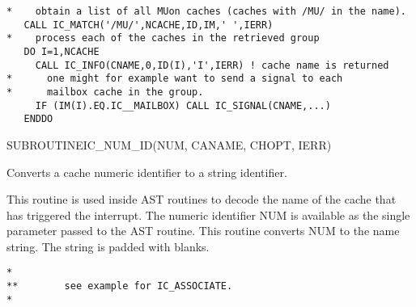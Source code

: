\begin{routine}
\begin{describe}
\end{describe}
\begin{options}
\end{options}
\begin{returncodes}
\end{returncodes}
\begin{examplecode}\begin{verbatim}
*    obtain a list of all MUon caches (caches with /MU/ in the name).
   CALL IC_MATCH('/MU/',NCACHE,ID,IM,' ',IERR)
*    process each of the caches in the retrieved group
   DO I=1,NCACHE
     CALL IC_INFO(CNAME,0,ID(I),'I',IERR) ! cache name is returned
*      one might for example want to send a signal to each
*      mailbox cache in the group.
     IF (IM(I).EQ.IC__MAILBOX) CALL IC_SIGNAL(CNAME,...)
   ENDDO
\end{verbatim}\end{examplecode}
\end{routine}


\begin{routine} %
\subroutine
   {SUBROUTINE}{IC\_NUM\_ID}{(NUM, CANAME, CHOPT, IERR)}
\begin{overview}
Converts a cache numeric identifier to a string identifier.
\end{overview}
\begin{argdeflist}
\end{argdeflist}
\begin{describe}

This routine is used inside AST routines to decode the name of the
cache that has triggered the interrupt. The numeric identifier NUM is
available as the single parameter passed to the AST routine. This
routine converts NUM to the name string. The string is padded with
blanks.

\end{describe}
\begin{options}
\end{options}
\begin{returncodes}
\end{returncodes}
\begin{examplecode}\begin{verbatim}
*
**        see example for IC_ASSOCIATE.
*
\end{verbatim}\end{examplecode}
\end{routine}


